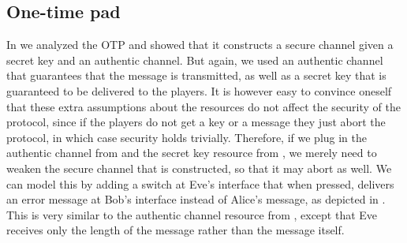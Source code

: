 \subsection{One-time pad}
\label{sec:smt.otp}

In  we analyzed the OTP and showed that it
constructs a secure channel given a secret key and an authentic
channel. But again, we used an authentic channel that guarantees that
the message is transmitted, as well as a secret key that is guaranteed
to be delivered to the players. It is however easy to convince oneself
that these extra assumptions about the resources do not affect the
security of the protocol, since if the players do not get a key or a
message they just abort the protocol, in which case security holds
trivially. Therefore, if we plug in the authentic channel from
 and the secret key resource from
, we merely need to weaken the secure channel
that is constructed, so that it may abort as well. We can model this
by adding a switch at Eve's interface that when pressed, delivers an
error message at Bob's interface instead of Alice's message, as
depicted in . This is very similar to the
authentic channel resource from , except
that Eve receives only the length of the message rather than the
message itself.

